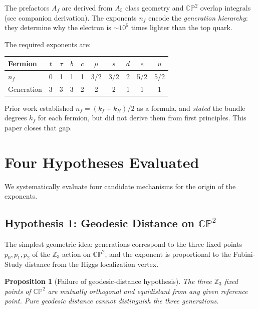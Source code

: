\documentclass[11pt,a4paper]{article}
\newcommand{\CP}{\mathbb{CP}}
\newcommand{\Z}{\mathbb{Z}}
\newtheorem{proposition}[theorem]{Proposition}
\theoremstyle{definition}
\theoremstyle{remark}
\begin{document}
The prefactors $A_f$ are derived from $A_5$ class geometry and $\CP^2$
overlap integrals (see companion derivation).  The exponents $n_f$
encode the \emph{generation hierarchy}: they determine why the electron
is $\sim 10^5$ times lighter than the top quark.

The required exponents are:
\begin{center}
\begin{tabular}{lccccccccc}
\toprule
Fermion & $t$ & $\tau$ & $b$ & $c$ & $\mu$ & $s$ & $d$ & $e$ & $u$ \\
\midrule
$n_f$ & 0 & 1 & 1 & 1 & 3/2 & 3/2 & 2 & 5/2 & 5/2 \\
Generation & 3 & 3 & 3 & 2 & 2 & 2 & 1 & 1 & 1 \\
\bottomrule
\end{tabular}
\end{center}

Prior work established $n_f = (k_f + k_H)/2$ as a formula, and
\emph{stated} the bundle degrees $k_f$ for each fermion, but did not
derive them from first principles.  This paper closes that gap.

\section{Four Hypotheses Evaluated}
\label{sec:hypotheses}

We systematically evaluate four candidate mechanisms for the origin
of the exponents.

\subsection{Hypothesis 1: Geodesic Distance on $\CP^2$}

The simplest geometric idea: generations correspond to the three
fixed points $p_0, p_1, p_2$ of the $\Z_3$ action on $\CP^2$,
and the exponent is proportional to the Fubini-Study distance
from the Higgs localization vertex.

\begin{proposition}[Failure of geodesic-distance hypothesis]
\label{prop:geodesic-fail}
The three $\Z_3$ fixed points of $\CP^2$ are mutually orthogonal
and equidistant from any given reference point.  Pure geodesic
distance cannot distinguish the three generations.
\end{proposition}
\end{document}
